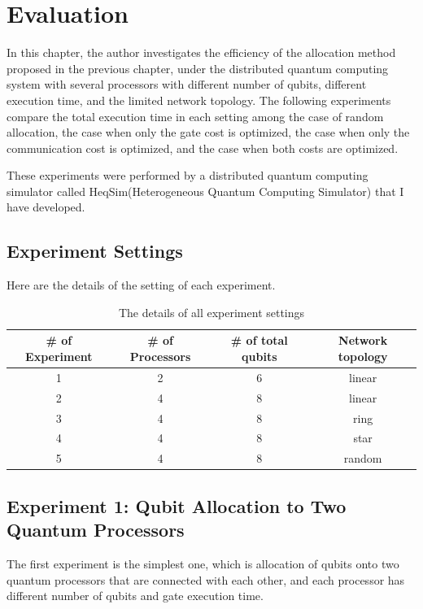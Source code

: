 \chapter{Evaluation}

 In this chapter, the author investigates the efficiency of the allocation method proposed in the previous chapter, under the distributed quantum computing system with several processors with different number of qubits, different execution time, and the limited network topology.  The following experiments compare the total execution time in each setting among the case of random allocation, the case when only the gate cost is optimized, the case when only the communication cost is optimized, and the case when both costs are optimized.
  
  These experiments were performed by a distributed quantum computing simulator called HeqSim(Heterogeneous Quantum Computing Simulator) \cite{heqsim} that I have developed.
  
\section{Experiment Settings}
 
 Here are the details of the setting of each experiment.
 
\begin{table}[htb]
\centering
  \caption{The details of all experiment settings}
 \begin{tabular}{|c|c|c|c|} \hline
 	\# of Experiment & \# of Processors & \# of total qubits & Network topology \\ \hline
	1 & 2 & 6 & linear \\ \hline
	2 & 4 & 8 & linear \\ \hline
	3 & 4 & 8 & ring \\ \hline
	4 & 4 & 8 & star \\ \hline
	5 & 4 & 8 & random \\ \hline
 \end{tabular}
 \end{table}
 
 \newpage
 
 \section{Experiment 1: Qubit Allocation to Two Quantum Processors}
 
 The first experiment is the simplest one, which is allocation of qubits onto two quantum processors that are connected with each other,  and each processor has different number of qubits and gate execution time.
 
